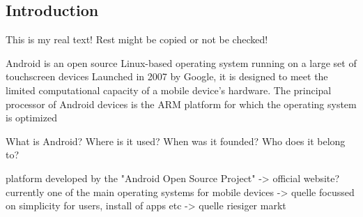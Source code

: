 \subsection{Introduction} \label{subsection:android-introduction}
This is my real text! Rest might be copied or not be checked!

%
Android is an open source Linux-based operating system running on a large set of touchscreen devices\newline
Launched in 2007 by Google, it is designed to meet the limited computational capacity of a mobile device’s hardware. The principal processor of Android devices is the ARM platform for which the operating system is optimized\newline
\cite{kovachevaMaster}
%


What is Android? Where is it used? When was it founded? Who does it belong to?\newline


platform developed by the "Android Open Source Project" -> official website?\newline
currently one of the main operating systems for mobile devices -> quelle\newline
focussed on simplicity for users, install of apps etc -> quelle\newline
riesiger markt\newline
